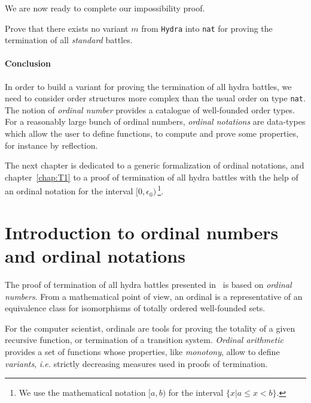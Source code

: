 We are now ready to complete our impossibility proof.

\vspace{4pt}


 

 

\begin{exercise}
Prove that there exists no variant $m$ from \texttt{Hydra} into \texttt{nat} for proving
    the  termination of all \emph{standard} battles.
\end{exercise}






\subsubsection{Conclusion}

In order to build a variant for proving the termination of all hydra battles, we need to consider order structures more complex than the usual order on type \texttt{nat}. 
The notion of \emph{ordinal number} provides a catalogue of well-founded order types.
For a reasonably large bunch of ordinal numbers, \emph{ordinal notations} are data-types which allow the \coq{} user to define functions, to compute and prove some properties, for instance by reflection.

The next chapter is dedicated to a generic formalization of ordinal notations, and chapter~\ref{chap:T1} to a proof of termination of all hydra battles with the help of an ordinal notation for the interval $[0,\epsilon_0)$\,\footnote{We use the mathematical notation $[a,b)$ for the interval $\{x|a\leq x < b\}$.}.
 

\chapter{Introduction to ordinal numbers and ordinal notations}


The proof of termination of all hydra battles presented in~\cite{KP82} is based
on \emph{ordinal numbers}.
From a mathematical point of view, an ordinal is a representative of an equivalence class for isomorphisms of  totally ordered well-founded sets.

For the computer scientist, ordinals are tools for proving the totality of a given recursive function, or termination of a transition system. \emph{Ordinal arithmetic} 
provides a set of functions whose properties, like \emph{monotony}, allow to define \emph{variants}, \emph{i.e.} strictly decreasing measures used in proofs of termination.

